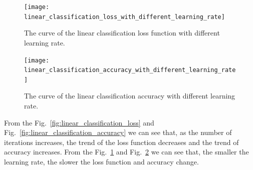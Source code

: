\documentclass[journal, a4paper]{IEEEtran}
\begin{document}
\begin{figure}[!hbt]
    \begin{center}
    \texttt{[image: linear\_classification\_loss\_with\_different\_learning\_rate]}
    \caption{The curve of the linear classification loss function with different learning rate.}
    \label{fig:linear_classification_loss_with_different_learning_rate}
    \end{center}
\end{figure}

\begin{figure}[!hbt]
    \begin{center}
    \texttt{[image: linear\_classification\_accuracy\_with\_different\_learning\_rate]}
    \caption{The curve of the linear classification accuracy with different learning rate.}
    \label{fig:linear_classification_accuracy_with_different_learning_rate}
    \end{center}
\end{figure}


From the Fig.~\ref{fig:linear_classification_loss} and Fig.~\ref{fig:linear_classification_accuracy} we can see that, as the number of iterations increases, the trend of the loss function decreases and the trend of accuracy increases.
From the Fig.~\ref{fig:linear_classification_loss_with_different_learning_rate} and Fig.~\ref{fig:linear_classification_accuracy_with_different_learning_rate} we can see that, the smaller the learning rate, the slower the loss function and accuracy change.







\end{document}
